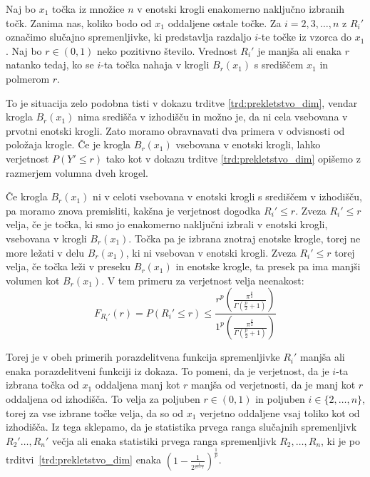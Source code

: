 \documentclass[12pt,a4paper,twoside]{article}
\theoremstyle{definition} %
\theoremstyle{plain} %
\numberwithin{equation}{section}  %
\begin{document}
Naj bo $x_1$ točka iz množice $n$ v enotski krogli enakomerno naključno izbranih točk.
Zanima nas, koliko bodo od $x_1$ oddaljene ostale točke. 
Za $i=2,3,\ldots, n$ z $R_i'$ označimo slučajno spremenljivke, ki predstavlja razdaljo $i$-te točke iz vzorca do $x_1$. 
Naj bo $r \in (0,1)$ neko pozitivno število.
Vrednost $R_i'$ je manjša ali enaka $r$ natanko tedaj, ko se $i$-ta točka nahaja v krogli $B_{r}(x_1)$ s središčem $x_1$ in polmerom $r$. 

To je situacija zelo podobna tisti v dokazu trditve \ref{trd:prekletstvo_dim}, vendar krogla $B_{r}(x_1)$ nima središča v izhodišču in možno je, da ni cela vsebovana v prvotni enotski krogli.
Zato moramo obravnavati dva primera v odvisnosti od položaja krogle.
Če je krogla $B_r(x_1)$ vsebovana v enotski krogli, lahko verjetnost $P(Y' \leq r)$ tako kot v dokazu trditve \ref{trd:prekletstvo_dim} opišemo z razmerjem volumna dveh krogel.

Če krogla $B_r(x_1)$ ni v celoti vsebovana v enotski krogli s središčem v izhodišču, pa moramo znova premisliti, kakšna je verjetnost dogodka $R_i' \leq r$.
Zveza $R_i' \leq r$ velja, če je točka, ki smo jo enakomerno naključni izbrali v enotski krogli, vsebovana v krogli $B_r(x_1)$.
Točka pa je izbrana znotraj enotske krogle, torej ne more ležati v delu $B_r(x_1)$, ki ni vsebovan v enotski krogli.
Zveza $R_i' \leq r$ torej velja, če točka leži v preseku $B_r(x_1)$ in enotske krogle, ta presek pa ima manjši volumen kot $B_r(x_1)$.
V tem primeru za verjetnost velja neenakost:
\begin{equation}
\label{eq:presek_krogel}
	F_{R_i'}(r) = P(R_i' \leq r) \leq 
	\frac{r^p \left( \frac{\pi^{\frac{p}{2}}}{\Gamma (\frac{p}{2}+1)} \right)}{1^p \left( \frac{\pi^{\frac{p}{2}}}{\Gamma (\frac{p}{2}+1)} \right)}
\end{equation}

Torej je v obeh primerih porazdelitvena funkcija spremenljivke $R_i'$ manjša ali enaka porazdelitveni funkciji iz dokaza.
To pomeni, da je verjetnost, da je $i$-ta izbrana točka od $x_1$ oddaljena manj kot $r$ manjša od verjetnosti, da je manj kot $r$ oddaljena od izhodišča.
To velja za poljuben $r \in (0,1)$ in poljuben $i \in \{2,\ldots,n\}$, torej za vse izbrane točke velja, da so od $x_1$ verjetno oddaljene vsaj toliko kot od izhodišča.
Iz tega sklepamo, da je statistika prvega ranga slučajnih spremenljivk $R_2'\ldots, R_n'$ večja ali enaka statistiki prvega ranga spremenljivk $R_2,\ldots,R_n$, ki je po trditvi~\ref{trd:prekletstvo_dim} enaka $(1 - \frac{1}{2^{\frac{1}{n-1}}})^{\frac{1}{p}}$.
\end{document}
